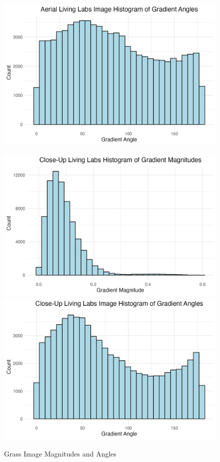 \documentclass[
  letterpaper,
  DIV=11,
  numbers=noendperiod]{scrreprt}
\begin{document}
\begin{figure}
\begin{minipage}{0.33\linewidth}
\includegraphics{images/plots/grass/aerial_living_lab_histogram_theta_plot.jpg}\end{minipage}%
%
\begin{minipage}{0.33\linewidth}
\includegraphics{images/plots/grass/close_up_living_lab_histogram_mag_plot.jpg}
\includegraphics{images/plots/grass/close_up_living_lab_histogram_theta_plot.jpg}\end{minipage}%

\caption{\label{fig-grass-histograms}Grass Image Magnitudes and Angles}

\end{figure}%
\end{document}
